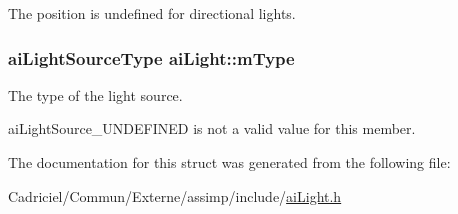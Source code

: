 The position is undefined for directional lights. \hypertarget{structai_light_a4cba1741875dd92724ff55be91c60c2b}{
\subsubsection[{m\-Type}]{ {\bf ai\-Light\-Source\-Type} ai\-Light\-::m\-Type}}\label{structai_light_a4cba1741875dd92724ff55be91c60c2b}
The type of the light source.

ai\-Light\-Source\-\_\-\-U\-N\-D\-E\-F\-I\-N\-E\-D is not a valid value for this member. 

The documentation for this struct was generated from the following file\-:\begin{DoxyCompactItemize}
\item 
Cadriciel/\-Commun/\-Externe/assimp/include/\hyperlink{ai_light_8h}{ai\-Light.\-h}\end{DoxyCompactItemize}

